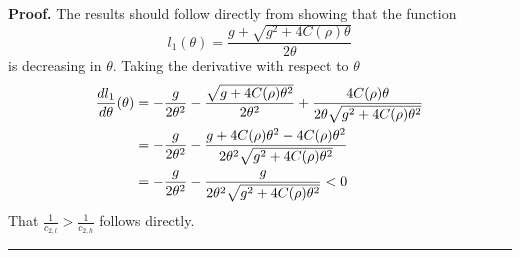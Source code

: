 \documentclass[thmsb,11pt]{article}
\newenvironment{proof}[1][Proof]{\noindent \textbf{#1.} }{\  \rule{0.5em}{0.5em}}
\begin{document}
\begin{proof}
The results should follow directly from showing that
the function
\begin{equation*}
l_1(\theta) = \frac{g+\sqrt{g^2+4C(\rho)\theta}}{2\theta}
\end{equation*}%
is decreasing in $\theta$. Taking the derivative with respect to $\theta$
\begin{align*}
\frac{d l_1}{d\theta}(\theta) &=- \frac g{2\theta^2}-\frac{\sqrt{%
g+4C(\rho)\theta^2}}{2\theta^2} +\frac{4C(\rho)\theta}{2\theta\sqrt{%
g^2+4C(\rho)\theta^2}} \\
&=-\frac g{2\theta^2}-\frac{g+4C(\rho)\theta^2-4C(\rho)\theta^2}{2\theta^2%
\sqrt{g^2+4C(\rho)\theta^2}} \\
&=-\frac g{2\theta^2}-\frac{g}{2\theta^2\sqrt{g^2+4C(\rho)\theta^2}}<0
\end{align*}
That $\frac1{c_{2,l}}>\frac1{c_{2,h}}$ follows directly.
\end{proof}
\end{document}
